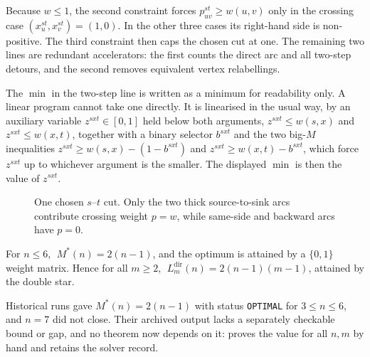 Because $w\le1$, the second constraint forces $p^{st}_{uv}\ge w(u,v)$ only in the crossing case $(x^{st}_u,x^{st}_v)=(1,0)$. In the other three cases its right-hand side is non-positive. The third constraint then caps the chosen cut at one. The remaining two lines are redundant accelerators: the first counts the direct arc and all two-step detours, and the second removes equivalent vertex relabellings.

The $\min$ in the two-step line is written as a minimum for readability only. A linear program cannot take one directly. It is linearised in the usual way, by an auxiliary variable $z^{sxt} \in [0,1]$ held below both arguments, $z^{sxt} \le w(s,x)$ and $z^{sxt} \le w(x,t)$, together with a binary selector $b^{sxt}$ and the two big-$M$ inequalities $z^{sxt} \ge w(s,x) - (1 - b^{sxt})$ and $z^{sxt} \ge w(x,t) - b^{sxt}$, which force $z^{sxt}$ up to whichever argument is the smaller. The displayed $\min$ is then the value of $z^{sxt}$.

\begin{figure}[ht]
\centering
{}
\caption{One chosen $s$--$t$ cut. Only the two thick source-to-sink arcs contribute crossing weight $p=w$, while same-side and backward arcs have $p=0$.}
\label{fig:cut}
\end{figure}
\begin{theorem}\label{thm:dir-multi-small}
For $n \le 6$, $\;M^{*}(n) = 2(n-1)$, and the optimum is attained by a $\{0,1\}$ weight matrix. Hence for all $m \ge 2$, $\;L_m^{\mathrm{dir}}(n) = 2(n - 1)(m - 1)$, attained by the double star.
\end{theorem}

Historical runs gave $M^{*}(n)=2(n-1)$ with status \texttt{OPTIMAL} for $3\le n\le6$, 
and $n=7$ did not close. Their archived output lacks a separately checkable bound or gap, 
and no theorem now depends on it:  proves the value for all $n,m$ by hand 
and  retains the solver record.
